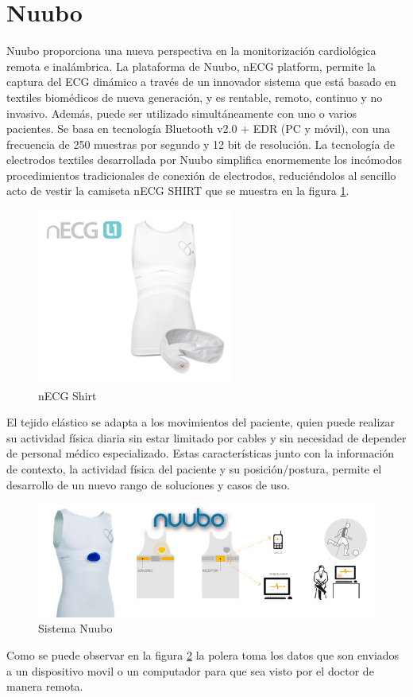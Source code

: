 \section{Nuubo\textregistered}

Nuubo\cite{nuubo} proporciona una nueva perspectiva en la monitorización cardiológica remota e inalámbrica. La plataforma de Nuubo, nECG platform, permite la captura del ECG dinámico a través de un innovador sistema que está basado en textiles biomédicos de nueva generación, y es rentable, remoto, continuo y no invasivo. Además, puede ser utilizado simultáneamente con uno o varios pacientes. Se basa en tecnología Bluetooth v2.0 + EDR (PC y móvil), con una frecuencia de 250 muestras por segundo y 12 bit de resolución\cite{nuubo_tel}.
La tecnología de electrodos textiles desarrollada por Nuubo simplifica enormemente los incómodos procedimientos tradicionales de conexión de electrodos, reduciéndolos al sencillo acto de vestir la camiseta nECG SHIRT que se muestra en la figura \ref{shirt}.

\begin{figure}[H]
	\centering
	\includegraphics[scale=0.6]{figuras/estadoarte/nuubo/shirt.png}
	\caption{nECG Shirt}
	\label{shirt}
\end{figure}

El tejido elástico se adapta a los movimientos del paciente, quien puede realizar su actividad física diaria sin estar limitado por cables y sin necesidad de depender de personal médico especializado. Estas características junto con la información de contexto, la actividad física del paciente y su posición/postura, permite el desarrollo de un nuevo rango de soluciones y casos de uso. 

\begin{figure}[H]
	\centering
	\includegraphics[scale=0.7]{figuras/estadoarte/nuubo/nuubo.png}
	\caption{Sistema Nuubo}
	\label{nuubo}
\end{figure}

Como se puede observar en la figura \ref{nuubo} la polera toma los datos que son enviados a un dispositivo movil o un computador para que sea visto por el doctor de manera remota.